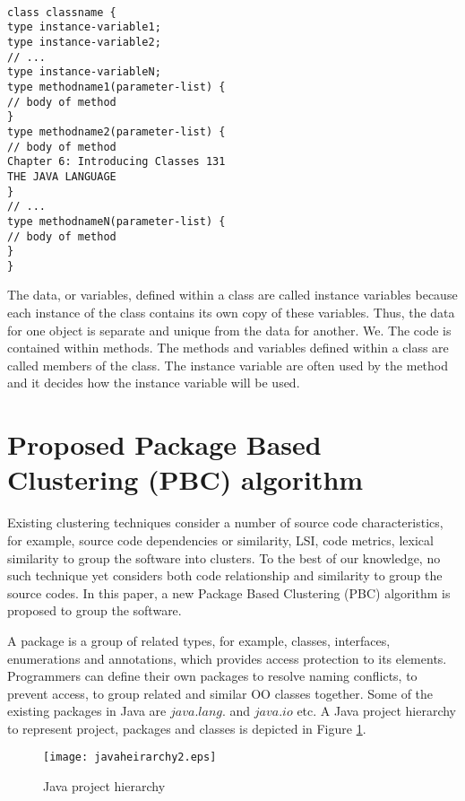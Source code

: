 \documentclass[12pt]{report}
\begin{document}
\begin{lstlisting}

class classname {
type instance-variable1;
type instance-variable2;
// ...
type instance-variableN;
type methodname1(parameter-list) {
// body of method
}
type methodname2(parameter-list) {
// body of method
Chapter 6: Introducing Classes 131
THE JAVA LANGUAGE
}
// ...
type methodnameN(parameter-list) {
// body of method
}
}

\end{lstlisting}

The data, or variables, defined within a class are called instance variables because each instance of the class contains its own copy of these variables. Thus, the data for one object is separate and unique from the data for another. We. The code is contained within methods. The methods and variables defined within a class are called members of the class. The instance variable are often used by the method and it decides how the instance variable will be used.  

\section{Proposed Package Based Clustering (PBC) algorithm}

Existing clustering techniques consider a number of source code characteristics, for example, source code dependencies or similarity, LSI, code metrics, lexical similarity to group the software into clusters. To the best of our knowledge, no such technique yet considers both code relationship and similarity to group the source codes. In this paper, a new Package Based Clustering (PBC) algorithm is proposed to group the software. 

A package is a group of related types, for example, classes, interfaces, enumerations and annotations, which provides access protection to its elements. Programmers can define their own packages to resolve naming conflicts, to prevent access, to group related and similar OO classes together. Some of the existing packages in Java are $java.lang.$ and $java.io$ etc. A Java project hierarchy to represent project, packages and classes is depicted in Figure \ref{JavaStructure}.

\begin{figure}[h!]
\centering
      \texttt{[image: javaheirarchy2.eps]}
			\caption{Java project hierarchy}
			\label{JavaStructure}
\end{figure}
\end{document}
